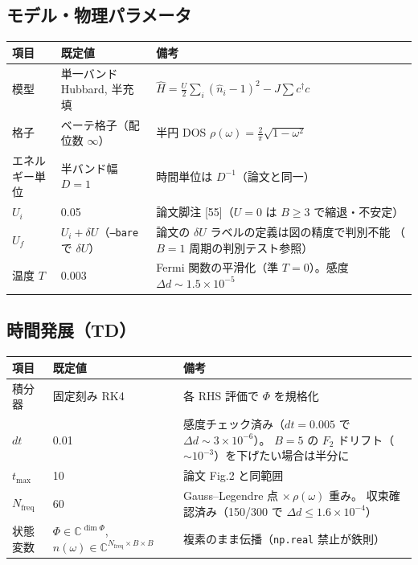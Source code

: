 \documentclass[11pt]{ltjsarticle}
\newcommand{\code}[1]{\texttt{#1}}
\begin{document}
\subsection*{モデル・物理パラメータ}
\begin{center}
\begin{tabular}{llp{}}
\toprule
項目 & 既定値 & 備考 \\
\midrule
模型 & 単一バンド Hubbard, 半充填 & $\hat H=\frac{U}{2}\sum_i(\hat n_i-1)^2 - J\sum c^\dagger c$ \\
格子 & ベーテ格子（配位数 $\infty$） & 半円 DOS $\rho(\omega)=\frac{2}{\pi}\sqrt{1-\omega^2}$ \\
エネルギー単位 & 半バンド幅 $D=1$ & 時間単位は $D^{-1}$（論文と同一） \\
$U_i$ & 0.05 & 論文脚注 [55]（$U{=}0$ は $B{\ge}3$ で縮退・不安定） \\
$U_f$ & $U_i+\delta U$（\code{--bare} で $\delta U$） & 論文の $\delta U$ ラベルの定義は図の精度で判別不能
（$B{=}1$ 周期の判別テスト参照） \\
温度 $T$ & 0.003 & Fermi 関数の平滑化（準 $T{=}0$）。感度 $\Delta d\sim1.5\times10^{-5}$ \\
\bottomrule
\end{tabular}
\end{center}

\subsection*{時間発展（TD）}
\begin{center}
\begin{tabular}{llp{}}
\toprule
項目 & 既定値 & 備考 \\
\midrule
積分器 & 固定刻み RK4 & 各 RHS 評価で $\Phi$ を規格化 \\
$dt$ & 0.01 & 感度チェック済み（$dt{=}0.005$ で $\Delta d\sim3\times10^{-6}$）。
$B{=}5$ の $F_2$ ドリフト（$\sim10^{-3}$）を下げたい場合は半分に \\
$t_{\max}$ & 10 & 論文 Fig.2 と同範囲 \\
$N_\text{freq}$ & 60 & Gauss--Legendre 点 $\times\,\rho(\omega)$ 重み。
収束確認済み（150/300 で $\Delta d\le1.6\times10^{-4}$） \\
状態変数 & $\Phi \in \mathbb{C}^{\dim\Phi}$, $n(\omega)\in\mathbb{C}^{N_\text{freq}\times B\times B}$ &
複素のまま伝播（\code{np.real} 禁止が鉄則） \\
\bottomrule
\end{tabular}
\end{center}
\end{document}

